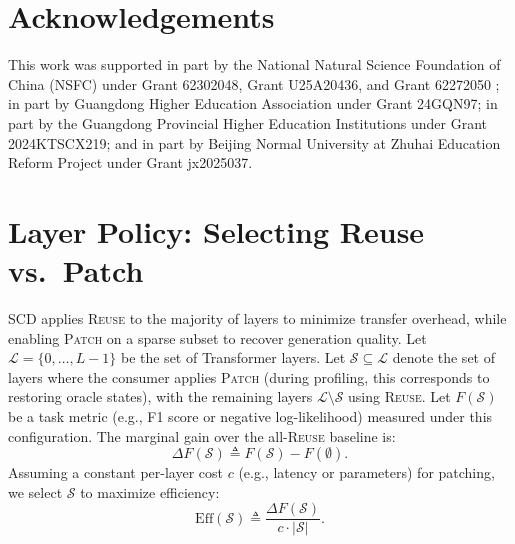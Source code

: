 \documentclass{article}
\theoremstyle{plain}
\theoremstyle{definition}
\theoremstyle{remark}
\begin{document}
\section*{Acknowledgements}

This work was supported in part by the National Natural Science Foundation of China (NSFC) under Grant 62302048, Grant U25A20436, and Grant 62272050 ; in part by Guangdong Higher Education Association under Grant 24GQN97; in part by the Guangdong Provincial Higher Education Institutions under Grant 2024KTSCX219; and in part by Beijing Normal University at Zhuhai Education Reform Project under Grant jx2025037.




\newpage
\appendix
\onecolumn




\section{Layer Policy: Selecting Reuse vs.\ Patch}
\label{sec:layer_select}

SCD applies \textsc{Reuse} to the majority of layers to minimize transfer overhead, while enabling \textsc{Patch} on a sparse subset to recover generation quality.
Let $\mathcal{L}=\{0,\dots,L\!-\!1\}$ be the set of Transformer layers.
Let $\mathcal{S} \subseteq \mathcal{L}$ denote the set of layers where the consumer applies \textsc{Patch} (during profiling, this corresponds to restoring oracle states), with the remaining layers $\mathcal{L} \setminus \mathcal{S}$ using \textsc{Reuse}.
Let $F(\mathcal{S})$ be a task metric (e.g., F1 score or negative log-likelihood) measured under this configuration. The marginal gain over the all-\textsc{Reuse} baseline is:
\begin{equation}
\Delta F(\mathcal{S}) \triangleq F(\mathcal{S}) - F(\emptyset).
\end{equation}
Assuming a constant per-layer cost $c$ (e.g., latency or parameters) for patching, we select $\mathcal{S}$ to maximize efficiency:
\begin{equation}
\mathrm{Eff}(\mathcal{S}) \triangleq \frac{\Delta F(\mathcal{S})}{c \cdot |\mathcal{S}|}.
\label{eq:eff_method}
\end{equation}
\end{document}
